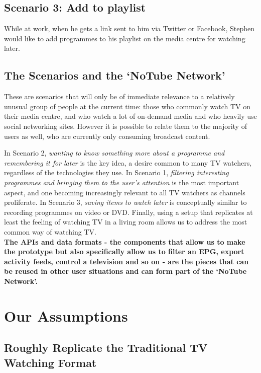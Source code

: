 \documentclass[]{article}%
\begin{document}
\subsection{Scenario 3: Add to playlist}

While at work, when he gets a link sent to him via Twitter or Facebook, Stephen would like to add programmes to his playlist on the media centre for watching later.

\subsection{The Scenarios and the `NoTube Network'}

These are scenarios that will only be of immediate relevance to a relatively unusual group of people at the current time: those who commonly watch TV on their media centre, and who watch a lot of on-demand media and who heavily use social networking sites. However it is possible to relate them to the majority of users as well, who are currently only consuming broadcast content.

In Scenario 2, \emph{wanting to know something more about a programme and remembering it for later} is the key idea, a desire common to many TV watchers, regardless of the technologies they use. In Scenario 1, \emph{filtering interesting programmes and bringing them to the user's attention} is the most important aspect, and one becoming increasingly relevant to all TV watchers as channels proliferate. In Scenario 3, \emph{saving items to watch later} is conceptually similar to recording programmes on video or DVD. Finally, using a setup that replicates at least the feeling of watching TV in a living room allows us to address the most common way of watching TV.
\\

{\bf The APIs and data formats - the components that allow us to make the prototype but also specifically allow us to filter an EPG, export activity feeds, control a television and so on - are the pieces that can be reused in other user situations and can form part of the `NoTube Network'.}

\section{Our Assumptions}

\subsection{Roughly Replicate the Traditional TV Watching Format}
\end{document}
